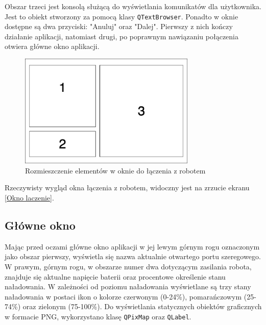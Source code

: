 Obszar trzeci jest konsolą służącą do wyświetlania komunikatów dla użytkownika. Jest to obiekt stworzony za pomocą klasy \texttt{QTextBrowser}. Ponadto w oknie dostępne są dwa przyciski: "Anuluj" oraz "Dalej". Pierwszy z nich kończy działanie aplikacji, natomiast drugi, po poprawnym nawiązaniu połączenia otwiera główne okno aplikacji.

\begin{figure}[h!]
    \centering
    \includegraphics[width=0.75\textwidth]{Rysunki/Rozdzial06/Laczenie_okno_koncepcja.png}
    \caption{Rozmieszczenie elementów w oknie do łączenia z robotem}
    \label{Okno laczenie koncepcja}
\end{figure}

Rzeczywisty wygląd okna łączenia z robotem, widoczny jest na zrzucie ekranu \ref{Okno laczenie}.

\subsection{Główne okno}

Mając przed oczami główne okno aplikacji w jej lewym górnym rogu oznaczonym jako obszar pierwszy, wyświetla się nazwa aktualnie otwartego portu szeregowego. W prawym, górnym rogu, w obszarze numer dwa dotyczącym zasilania robota, znajduje się aktualne napięcie baterii oraz procentowe określenie stanu naładowania. W zależności od poziomu naładowania wyświetlane są trzy stany naładowania w postaci ikon o kolorze czerwonym (0-24\%), pomarańczowym (25-74\%) oraz zielonym (75-100\%). Do wyświetlania statycznych obiektów graficznych w formacie PNG, wykorzystano klasę \texttt{QPixMap} oraz \texttt{QLabel}.

